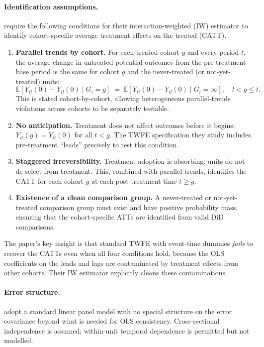 \documentclass[12pt]{article}
\begin{document}
\paragraph{Identification assumptions.}
\citet{sun2021estimating} require the following conditions for their
interaction-weighted (IW) estimator to identify cohort-specific
average treatment effects on the treated (CATT).
\begin{enumerate}
  \item \textbf{Parallel trends by cohort.}
        For each treated cohort $g$ and every period $t$, the average change
        in untreated potential outcomes from the pre-treatment base period is
        the same for cohort $g$ and the never-treated (or not-yet-treated)
        units:
        \[
          \mathbb{E}[Y_{it}(0) - Y_{il}(0) \mid G_i = g]
          \;=\;
          \mathbb{E}[Y_{it}(0) - Y_{il}(0) \mid G_i = \infty],
          \quad l < g \leq t.
        \]
        This is stated cohort-by-cohort, allowing heterogeneous parallel-trends
        violations across cohorts to be separately testable.

  \item \textbf{No anticipation.}
        Treatment does not affect outcomes before it begins:
        $Y_{it}(g) = Y_{it}(0)$ for all $t < g$.
        The TWFE specification they study includes pre-treatment ``leads''
        precisely to test this condition.

  \item \textbf{Staggered irreversibility.}
        Treatment adoption is absorbing: units do not de-select from treatment.
        This, combined with parallel trends, identifies the CATT for each
        cohort $g$ at each post-treatment time $t \geq g$.

  \item \textbf{Existence of a clean comparison group.}
        A never-treated or not-yet-treated comparison group must exist and
        have positive probability mass, ensuring that the cohort-specific
        ATTs are identified from valid DiD comparisons.
\end{enumerate}
The paper's key insight is that standard TWFE with event-time dummies
\textit{fails} to recover the CATTs even when all four conditions hold,
because the OLS coefficients on the leads and lags are contaminated by
treatment effects from other cohorts.
Their IW estimator explicitly cleans these contaminations.

\paragraph{Error structure.}
\citet{sun2021estimating} adopt a standard linear panel model with no special
structure on the error covariance beyond what is needed for OLS consistency.
Cross-sectional independence is assumed; within-unit temporal dependence is
permitted but not modelled.
\end{document}
